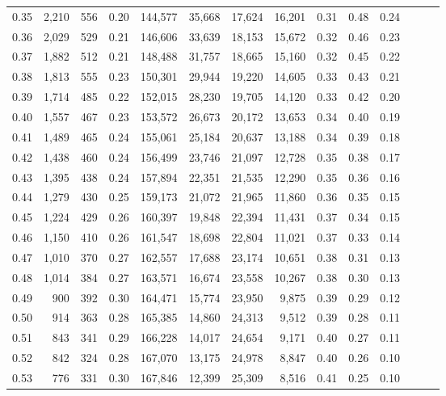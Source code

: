 \begin{tabular}{rrrrrrrrrrrrrr}
0.35 &  2,210 &  556 &  0.20 &  144,577 &   35,668 &  17,624 &  16,201 &  0.31 &  0.48 &      0.24 \\
0.36 &  2,029 &  529 &  0.21 &  146,606 &   33,639 &  18,153 &  15,672 &  0.32 &  0.46 &      0.23 \\
0.37 &  1,882 &  512 &  0.21 &  148,488 &   31,757 &  18,665 &  15,160 &  0.32 &  0.45 &      0.22 \\
0.38 &  1,813 &  555 &  0.23 &  150,301 &   29,944 &  19,220 &  14,605 &  0.33 &  0.43 &      0.21 \\
0.39 &  1,714 &  485 &  0.22 &  152,015 &   28,230 &  19,705 &  14,120 &  0.33 &  0.42 &      0.20 \\
0.40 &  1,557 &  467 &  0.23 &  153,572 &   26,673 &  20,172 &  13,653 &  0.34 &  0.40 &      0.19 \\
0.41 &  1,489 &  465 &  0.24 &  155,061 &   25,184 &  20,637 &  13,188 &  0.34 &  0.39 &      0.18 \\
0.42 &  1,438 &  460 &  0.24 &  156,499 &   23,746 &  21,097 &  12,728 &  0.35 &  0.38 &      0.17 \\
0.43 &  1,395 &  438 &  0.24 &  157,894 &   22,351 &  21,535 &  12,290 &  0.35 &  0.36 &      0.16 \\
0.44 &  1,279 &  430 &  0.25 &  159,173 &   21,072 &  21,965 &  11,860 &  0.36 &  0.35 &      0.15 \\
0.45 &  1,224 &  429 &  0.26 &  160,397 &   19,848 &  22,394 &  11,431 &  0.37 &  0.34 &      0.15 \\
0.46 &  1,150 &  410 &  0.26 &  161,547 &   18,698 &  22,804 &  11,021 &  0.37 &  0.33 &      0.14 \\
0.47 &  1,010 &  370 &  0.27 &  162,557 &   17,688 &  23,174 &  10,651 &  0.38 &  0.31 &      0.13 \\
0.48 &  1,014 &  384 &  0.27 &  163,571 &   16,674 &  23,558 &  10,267 &  0.38 &  0.30 &      0.13 \\
0.49 &    900 &  392 &  0.30 &  164,471 &   15,774 &  23,950 &   9,875 &  0.39 &  0.29 &      0.12 \\
0.50 &    914 &  363 &  0.28 &  165,385 &   14,860 &  24,313 &   9,512 &  0.39 &  0.28 &      0.11 \\
0.51 &    843 &  341 &  0.29 &  166,228 &   14,017 &  24,654 &   9,171 &  0.40 &  0.27 &      0.11 \\
0.52 &    842 &  324 &  0.28 &  167,070 &   13,175 &  24,978 &   8,847 &  0.40 &  0.26 &      0.10 \\
0.53 &    776 &  331 &  0.30 &  167,846 &   12,399 &  25,309 &   8,516 &  0.41 &  0.25 &      0.10 \\

\end{tabular}
